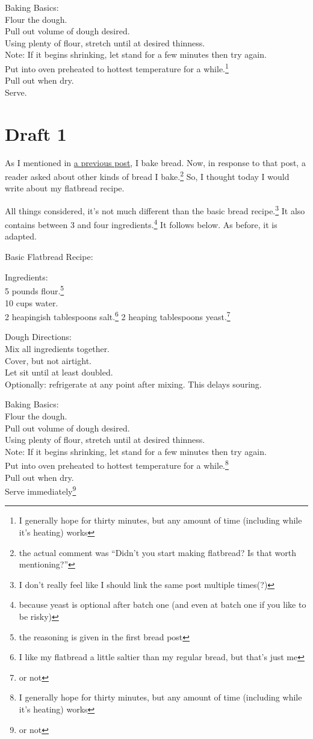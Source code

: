 \documentclass[12pt]{article}[titlepage]
\newcommand{\say}[1]{``#1''}
\newcommand{\1}{\={a}}
\newcommand{\2}{\={e}}
\newcommand{\3}{\={\i}}
\newcommand{\4}{\=o}
\newcommand{\5}{\=u}
\newcommand{\6}{\={A}}
\renewcommand{\,}{\textsuperscript{,}}
\begin{document}
Baking Basics:\\
Flour the dough.\\
Pull out volume of dough desired.\\
Using plenty of flour, stretch until at desired thinness.\\
Note: If it begins shrinking, let stand for a few minutes then try again.\\
Put into oven preheated to hottest temperature for a while.\footnote{I generally hope for thirty minutes, but any amount of time (including while it's heating) works}\\
Pull out when dry.\\
Serve.

\section{Draft 1}
As I mentioned in \href{basic-bread-recipe.html}{a previous post}, I bake bread.
Now, in response to that post, a reader asked about other kinds of bread I bake.\footnote{the actual comment was \say{Didn't you start making flatbread? Is that worth mentioning?}}
So, I thought today I would write about my flatbread recipe.

All things considered, it's not much different than the basic bread recipe.\footnote{I don't really feel like I should link the same post multiple times(?)}
It also contains between 3 and four ingredients.\footnote{because yeast is optional after batch one (and even at batch one if you like to be risky)}
It follows below.
As before, it is adapted.

Basic Flatbread Recipe:

Ingredients:\\
5 pounds flour.\footnote{the reasoning is given in the first bread post}\\
10 cups water.\\
2 heapingish tablespoons salt.\footnote{I like my flatbread a little saltier than my regular bread, but that's just me}
2 heaping tablespoons yeast.\footnote{or not}

Dough Directions:\\
Mix all ingredients together.\\
Cover, but not airtight.\\
Let sit until at least doubled.\\
Optionally: refrigerate at any point after mixing.
This delays souring.

Baking Basics:\\
Flour the dough.\\
Pull out volume of dough desired.\\
Using plenty of flour, stretch until at desired thinness.\\
Note: If it begins shrinking, let stand for a few minutes then try again.\\
Put into oven preheated to hottest temperature for a while.\footnote{I generally hope for thirty minutes, but any amount of time (including while it's heating) works}\\
Pull out when dry.\\
Serve immediately\footnote{or not}
\end{document}
